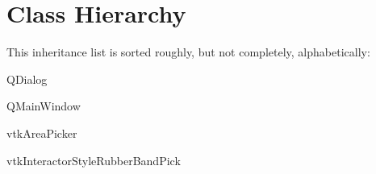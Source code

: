 \section{Class Hierarchy}
This inheritance list is sorted roughly, but not completely, alphabetically\+:\begin{DoxyCompactList}
\item Q\+Dialog\begin{DoxyCompactList}
\item {}
\item {}
\end{DoxyCompactList}
\item Q\+Main\+Window\begin{DoxyCompactList}
\item {}
\end{DoxyCompactList}
\item vtk\+Area\+Picker\begin{DoxyCompactList}
\item {}
\end{DoxyCompactList}
\item vtk\+Interactor\+Style\+Rubber\+Band\+Pick\begin{DoxyCompactList}
\item {}
\end{DoxyCompactList}
\end{DoxyCompactList}

